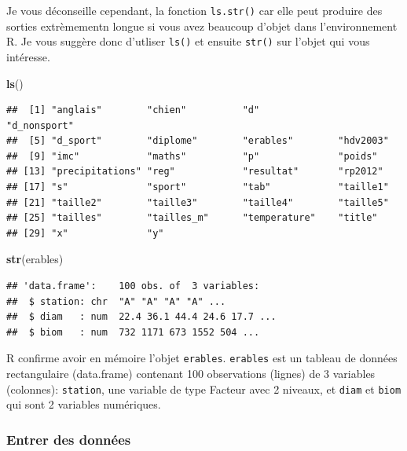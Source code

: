 \documentclass[12pt,]{book}
\makeatletter
\newenvironment{Shaded}{\begin{snugshade}}{\end{snugshade}}
\newcommand{\KeywordTok}[1]{\textcolor[rgb]{0.27,0.27,0.27}{\textbf{#1}}}
\newcommand{\NormalTok}[1]{#1}
\newenvironment{kframe}{%
\medskip{}
\setlength{\fboxsep}{.8em}
 \def\at@end@of@kframe{}%
 \ifinner\ifhmode%
  \def\at@end@of@kframe{\end{minipage}}%
  \begin{minipage}{\columnwidth}%
 \fi\fi%
 \def\FrameCommand##1{\hskip\@totalleftmargin \hskip-\fboxsep
 \colorbox{shadecolor}{##1}\hskip-\fboxsep
     \hskip-\linewidth \hskip-\@totalleftmargin \hskip\columnwidth}%
 \MakeFramed {\advance\hsize-\width
   \@totalleftmargin\z@ \linewidth\hsize
   \@setminipage}}%
 {\par\unskip\endMakeFramed%
 \at@end@of@kframe}
\newenvironment{rmdblock}[1]
  {
  \begin{itemize}
  \renewcommand{\labelitemi}{
    \raisebox{-.7\height}[0pt][0pt]{
      {\setkeys{Gin}{width=3em,keepaspectratio}\texttt{[image: images/\#1]}}
    }
  }
  \setlength{\fboxsep}{1em}
  \begin{kframe}
  \item
  }
  {
  \end{kframe}
  \end{itemize}
  }
\newenvironment{rmdtip}
  {\begin{rmdblock}{tip}}
  {\end{rmdblock}}
\makeatother
\begin{document}
\begin{rmdtip}
Je vous déconseille cependant, la fonction \texttt{ls.str()} car elle peut produire des sorties extrèmementn longue si vous avez beaucoup d'objet dans l'environnement R. Je vous suggère donc d'utliser \texttt{ls()} et ensuite \texttt{str()} sur l'objet qui vous intéresse.
\end{rmdtip}

\begin{Shaded}
\begin{Highlighting}[]
\KeywordTok{ls}\NormalTok{()}
\end{Highlighting}
\end{Shaded}

\begin{verbatim}
##  [1] "anglais"        "chien"          "d"              "d_nonsport"    
##  [5] "d_sport"        "diplome"        "erables"        "hdv2003"       
##  [9] "imc"            "maths"          "p"              "poids"         
## [13] "precipitations" "reg"            "resultat"       "rp2012"        
## [17] "s"              "sport"          "tab"            "taille1"       
## [21] "taille2"        "taille3"        "taille4"        "taille5"       
## [25] "tailles"        "tailles_m"      "temperature"    "title"         
## [29] "x"              "y"
\end{verbatim}

\begin{Shaded}
\begin{Highlighting}[]
\KeywordTok{str}\NormalTok{(erables)}
\end{Highlighting}
\end{Shaded}

\begin{verbatim}
## 'data.frame':	100 obs. of  3 variables:
##  $ station: chr  "A" "A" "A" "A" ...
##  $ diam   : num  22.4 36.1 44.4 24.6 17.7 ...
##  $ biom   : num  732 1171 673 1552 504 ...
\end{verbatim}

R confirme avoir en mémoire l'objet \texttt{erables}.
\texttt{erables} est un tableau de données rectangulaire (data.frame) contenant 100 observations (lignes) de 3 variables (colonnes): \texttt{station}, une variable de type Facteur avec 2 niveaux, et \texttt{diam} et \texttt{biom} qui sont 2 variables numériques.

\hypertarget{entrer-des-donnuxe9es}{%
\subsubsection{Entrer des données}\label{entrer-des-donnuxe9es}}
\end{document}
